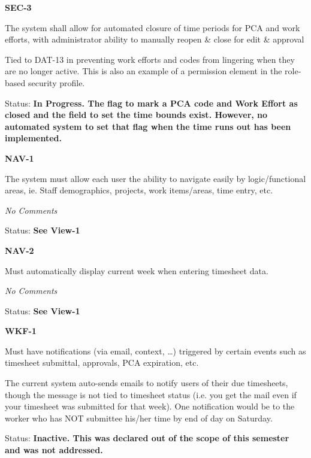 \documentclass{article}
\begin{document}
\noindent \textit{}


\noindent \textbf{SEC-3}

\noindent The system shall allow for automated closure of time periods for PCA and work efforts, with administrator ability to manually reopen \& close for edit \& approval

\noindent Tied to DAT-13 in preventing work efforts and codes from lingering when they are no longer active. This is also an example of a permission element in the role-based security profile.

\noindent Status: \textbf{In Progress.  The flag to mark a PCA code and Work Effort as closed and the field to set the time bounds exist.  However, no automated system to set that flag when the time runs out has been implemented.}

\noindent \textit{}


\noindent \textbf{NAV-1}

\noindent The system must allow each user the ability to navigate easily by logic/functional areas, ie. Staff demographics, projects, work items/areas, time entry, etc.

 \textit{No Comments}

Status: \textbf{See View-1}\textit{}

\noindent \textit{}


\noindent \textbf{NAV-2}

\noindent Must automatically display current week when entering timesheet data.

 \textit{No Comments }

\textit{ }Status: \textbf{See View-1}\textit{}

\noindent \textit{}


\noindent \textbf{WKF-1}

\noindent Must have notifications (via email, context, \dots ) triggered by certain events such as timesheet submittal, approvals, PCA expiration, etc.

\noindent The current system auto-sends emails to notify users of their due timesheets, though the message is not tied to timesheet status (i.e. you get the mail even if your timesheet was submitted for that week). One notification would be to the worker who has NOT submittee his/her time by end of day on Saturday.

\noindent Status: \textbf{Inactive.  This was declared out of the scope of this semester and was not addressed.}

\noindent \textit{}
\end{document}
